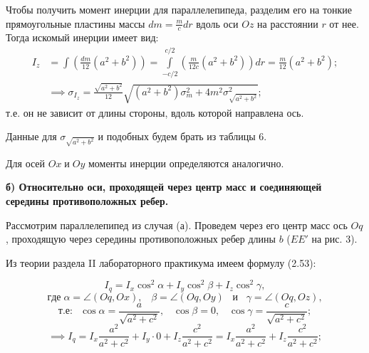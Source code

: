 \documentclass[a4paper, 12pt]{article}
\begin{document}
        Чтобы получить момент инерции для параллелепипеда, разделим его на тонкие прямоугольные пластины массы $dm = \frac{m}{c}dr$ вдоль оси $Oz$ на расстоянии $r$ от нее. Тогда искомый инерции имеет вид:
        \begin{equation*}
            \begin{aligned}
            I_{z} & = \int \left(\frac{dm}{12}(a^2+b^2)\right) =\int\limits_{-c/2}^{c/2} \left(\frac{m}{12c}(a^2+b^2)\right)dr = \frac{m}{12}(a^2 + b^2);\\
            & \implies \sigma_{I_{z}} = \frac{\sqrt{a^2+b^2}}{12}\sqrt{(a^2+b^2)\sigma_m^2 + 4m^2\sigma_{\sqrt{a^2+b^2}}^2};
            \end{aligned}
        \end{equation*}
        т.е. он не зависит от длины стороны, вдоль которой направлена ось. 

        Данные для $\sigma_{\sqrt{a^2+b^2}}$ и подобных будем брать из таблицы 6.
        
        Для осей $Ox\;и\;Oy$ моменты инерции определяются аналогично.
        
        \newpage

        \textbf{б) Относительно оси, проходящей через центр масс и соединяющей середины противоположных ребер.}

        Рассмотрим параллелепипед из случая (а). Проведем через его центр масс ось $Oq$, проходящую через середины противоположных ребер длины $b$ ($EE'$ на рис. 3). 

        Из теории раздела II лабораторного практикума имеем формулу (2.53):
        
        \begin{equation*}
            I_q = I_x\cos^2{\alpha} + I_y\cos^2{\beta} + I_z\cos^2{\gamma},
        \end{equation*}
        \begin{equation*}
            где\;\alpha = \angle (Oq, Ox),\;\;\;\beta = \angle (Oq, Oy)\;\;\;и\;\;\;\gamma = \angle (Oq, Oz),
        \end{equation*}
        \begin{equation*}
            т.е:\;\;
            \cos{\alpha} = \frac{a}{\sqrt{a^2+c^2}},
            \;\;\;
            \cos{\beta} = 0,
            \;\;\;
            \cos{\gamma} = \frac{c}{\sqrt{a^2+c^2}};
        \end{equation*}
        \begin{equation*}
            \implies I_q = I_x\frac{a^2}{a^2+c^2} + I_y\cdot 0 + I_z\frac{c^2}{a^2+c^2} = I_x\frac{a^2}{a^2+c^2} + I_z\frac{c^2}{a^2+c^2};
        \end{equation*}
\end{document}
